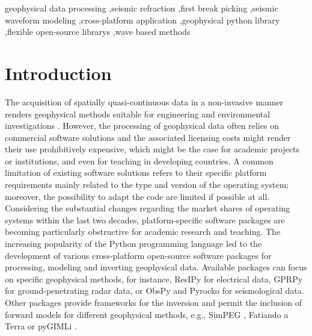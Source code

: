 \documentclass[a4paper,fleqn]{cas-sc}
\begin{document}
\begin{keywords}
geophysical data processing \sep seismic refraction \sep first break picking \sep seismic waveform modeling \sep cross-platform application \sep geophysical python library \sep flexible open-source librarys \sep wave based methods
\end{keywords}

\maketitle 

\printcredits

\doublespacing

\section{Introduction}
\label{intro}

The acquisition of spatially quasi-continuous data in a non-invasive manner renders geophysical methods suitable for engineering and environmental investigations \citep[e.g.,][]{parsekian2015, nguyen2018, romero2019}. 
However, the processing of geophysical data often relies on commercial software solutions and the associated licensing costs might render their use prohibitively expensive, which might be the case for academic projects or institutions, and even for teaching in developing countries.
A common limitation of existing software solutions refers to their specific platform requirements mainly related to the type and version of the operating system; moreover, the possibility to adapt the code are limited if possible at all. Considering the substantial changes regarding the market shares of operating systems within the last two decades, platform-specific software packages are becoming particularly obstructive for academic research and teaching.
The increasing popularity of the Python programming language led to the development of various cross-platform open-source software packages for processing, modeling and inverting geophysical data. Available packages can focus on specific geophysical methods, for instance, ResIPy \citep{blanchy2020} for electrical data, GPRPy \citep{plattner2020} for ground-penetrating radar data, or ObsPy \citep{beyreuther2010} and Pyrocko \citep{heimann2017} for seismological data. Other packages provide frameworks for the inversion and permit the inclusion of forward models for different geophysical methods, e.g., SimPEG \citep{cockett2015}, Fatiando a Terra \citep{uieda2013} or pyGIMLi \citep{ruecker2017}. 
\end{document}

